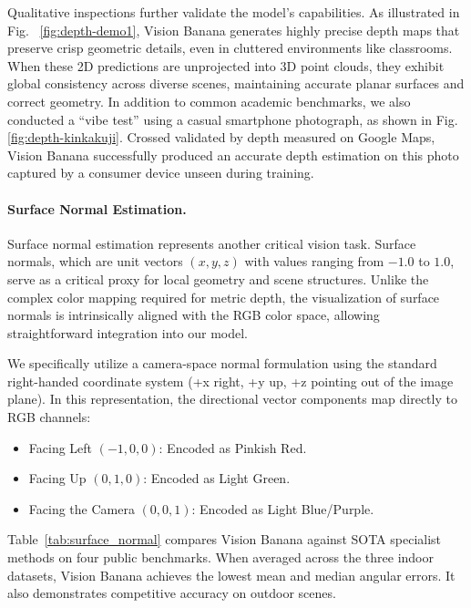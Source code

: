 \documentclass[11pt, a4paper, copyright, gdm]{google}
\begin{document}
Qualitative inspections further validate the model's capabilities. As illustrated in Fig. ~\ref{fig:depth-demo1}, Vision Banana generates highly precise depth maps that preserve crisp geometric details, even in cluttered environments like classrooms. 
When these 2D predictions are unprojected into 3D point clouds, they exhibit global consistency across diverse scenes, maintaining accurate planar surfaces and correct geometry. 
In addition to common academic benchmarks, we also conducted a ``vibe test'' using a casual smartphone photograph, as shown in Fig. \ref{fig:depth-kinkakuji}. Crossed validated by depth measured on Google Maps, Vision Banana successfully produced an accurate depth estimation on this photo captured by a consumer device unseen during training.



\paragraph{Surface Normal Estimation.}

Surface normal estimation represents another critical vision task. Surface normals, which are unit vectors $(x, y, z)$ with values ranging from $-1.0$ to $1.0$, serve as a critical proxy for local geometry and scene structures. 
Unlike the complex color mapping required for metric depth, the visualization of surface normals is intrinsically aligned with the RGB color space, allowing straightforward integration into our model. 


We specifically utilize a camera-space normal formulation using the standard right-handed coordinate system (+x right, +y up, +z pointing out of the image plane). In this representation, the directional vector components map directly to RGB channels:

\begin{itemize}
    \item Facing Left $(-1, 0, 0)$: Encoded as  Pinkish Red.
    \item Facing Up $(0, 1, 0)$: Encoded as Light Green.
    \item Facing the Camera $(0, 0, 1)$: Encoded as Light Blue/Purple.
\end{itemize}


Table~\ref{tab:surface_normal} compares Vision Banana against SOTA specialist methods on four public benchmarks. When averaged across the three indoor datasets, Vision Banana achieves the lowest mean and median angular errors. It also demonstrates competitive accuracy on outdoor scenes.
\end{document}
